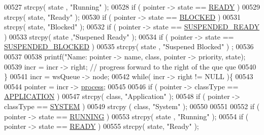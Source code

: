 \begin{DoxyCode}
{00527                         strcpy( state , \textcolor{stringliteral}{"Running"} );
00528                 \textcolor{keywordflow}{if} ( pointer -> state == \hyperlink{mpx__r2_8h_ad1235d5ce36f7267285e82dccd428aa6}{READY} ) 
00529                         strcpy( state, \textcolor{stringliteral}{"Ready"} );
00530                 \textcolor{keywordflow}{if} ( pointer -> state == \hyperlink{mpx__r2_8h_a48f6457243719e7031768d4100741159}{BLOCKED} ) 
00531                         strcpy( state, \textcolor{stringliteral}{"Blocked"} );
00532                 \textcolor{keywordflow}{if} ( pointer -> state == \hyperlink{mpx__r2_8h_a07b1141143e8825b04670da23fca8cc7}{SUSPENDED_READY} ) 
00533                         strcpy( state ,\textcolor{stringliteral}{"Suspened Ready"} );
00534                 \textcolor{keywordflow}{if} ( pointer -> state == \hyperlink{mpx__r2_8h_a6e41bb5a80c5049e8d364bab8ee4d73a}{SUSPENDED_BLOCKED} ) 
00535                         strcpy( state , \textcolor{stringliteral}{"Suspened Blocked"} ) ;
00536                 
00537                 
00538                 printf(\textcolor{stringliteral}{"Name: %
      pointer -> name, \textcolor{keyword}{class}, pointer -> priority, state); 
00539                 incr = incr -> right; \textcolor{comment}{// progress forward to the right of the que
      que}
00540         \}
00541         incr = wsQueue -> node;
00542         \textcolor{keywordflow}{while}( incr -> right != NULL )\{
00543                 
00544                 pointer = incr -> \hyperlink{structprocess}{process};
00545         
00546                 \textcolor{keywordflow}{if} ( pointer -> classType  == \hyperlink{mpx__r2_8h_a796bd7c6ba2e59281760fb155c6287e8}{APPLICATION} )
00547                         strcpy( \textcolor{keyword}{class}, \textcolor{stringliteral}{"Application"} );
00548                 \textcolor{keywordflow}{if} (  pointer -> classType == \hyperlink{mpx__r2_8h_a21b97df85e65556468b28a576311271c}{SYSTEM} )
00549                         strcpy ( \textcolor{keyword}{class}, \textcolor{stringliteral}{"System"} );
00550                 
00551                 
00552                 \textcolor{keywordflow}{if} ( pointer -> state == \hyperlink{mpx__r2_8h_a6fb7181d994ee98e735494be55809708}{RUNNING} ) 
00553                         strcpy( state , \textcolor{stringliteral}{"Running"} );
00554                 \textcolor{keywordflow}{if} ( pointer -> state == \hyperlink{mpx__r2_8h_ad1235d5ce36f7267285e82dccd428aa6}{READY} ) 
00555                         strcpy( state, \textcolor{stringliteral}{"Ready"} );
}}
\end{DoxyCode}
